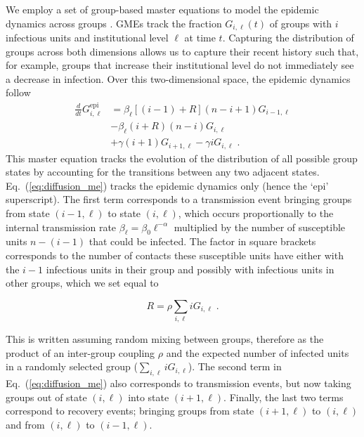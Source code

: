 We employ a set of group-based master equations to model the epidemic dynamics across groups \cite{hebert-dufresne_propagation_2010}. GMEs track the fraction $G_{i,\ell}(t)$ of groups with $i$ infectious units and institutional level $\ell$ at time $t$. Capturing the distribution of groups across both dimensions allows us to capture their recent history such that, for example, groups that increase their institutional level do not immediately see a decrease in infection. Over this two-dimensional space, the epidemic dynamics follow
\begin{equation} \label{eq:diffusion_me}
    \begin{split}
        \frac{d}{dt}G_{i,\ell}^{\textrm{epi}} &= \beta_\ell\left[(i-1)+R\right]\left(n-i+1\right)G_{i-1,\ell} \\
        &- \beta_\ell\left(i+R\right)\left(n-i\right)G_{i,\ell} \\
        &+ \gamma\left(i+1\right)G_{i+1,\ell} - \gamma i G_{i,\ell} \; . 
    \end{split}
\end{equation}
This master equation tracks the evolution of the distribution of all possible group states by accounting for the transitions between any two adjacent states. Eq.~(\ref{eq:diffusion_me}) tracks the epidemic dynamics only (hence the `epi' superscript). The first term corresponds to a transmission event bringing groups from state $(i-1,\ell)$ to state $(i,\ell)$, which occurs proportionally to the internal transmission rate $\beta_\ell = \beta_0\ell^{-\alpha}$ multiplied by the number of susceptible units $n-(i-1)$ that could be infected. The factor in square brackets corresponds to the number of contacts these susceptible units have either with the $i-1$ infectious units in their group and possibly with infectious units in other groups, which we set equal to

\begin{equation}
R = \rho \sum _{i,\ell} i G_{i,\ell} \; .
\end{equation}

This is written assuming random mixing between groups, therefore as the product of an inter-group coupling $\rho$ and the expected number of infected units in a randomly selected group ($\sum _{i,\ell} i G_{i,\ell}$).
The second term in Eq.~(\ref{eq:diffusion_me}) also corresponds to transmission events, but now taking groups out of state $(i,\ell)$ into state $(i+1,\ell)$. Finally, the last two terms correspond to recovery events; bringing groups from state $(i+1,\ell)$ to $(i,\ell)$ and from $(i,\ell)$ to $(i-1,\ell)$.

